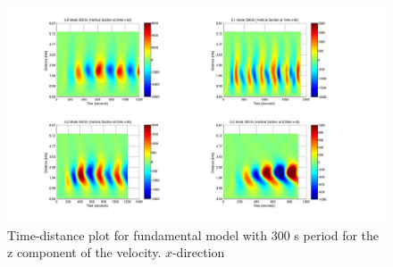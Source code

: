 \documentclass[preprint,authoryear,12pt]{elsarticle}
\begin{document}

\begin{figure}[h]
\includegraphics[scale=0.8]{imrescale/dt_300_vert_x.jpg}
\caption{Time-distance plot for fundamental model with 300 s period for the z component of the velocity. $x$-direction }
\label{Fig7}
\end{figure}






\end{document}
